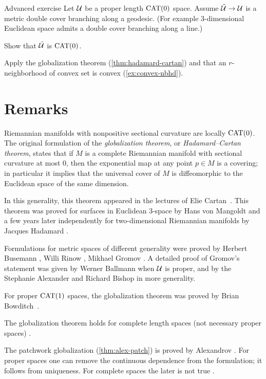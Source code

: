 \begin{thm}{Advanced exercise}\label{ex:branching-cover} 
Let $\mathcal{U}$ be a proper length $\mathrm{CAT}(0)$ space.
Assume $\tilde{\mathcal{U}}\to \mathcal{U}$ is a metric  double cover branching along a geodesic.
(For example 3-dimensional Euclidean space admits a double cover branching along a line.)

Show that $\tilde{\mathcal{U}}$ is $\mathrm{CAT}(0)$.
\end{thm}

 Apply the globalization theorem (\ref{thm:hadamard-cartan}) and that an $r$-neighborhood of convex set is convex (\ref{ex:convex-nbhd}).


\section{Remarks}

Riemannian manifolds with nonpositive sectional curvature are locally $\mathrm{CAT}(0)$.
The original formulation of the 
\emph{globalization theorem}, or 
\emph{Hadamard--Cartan theorem}, states that if $M$ is a complete Riemannian manifold with sectional curvature at most $0$,  
then the exponential map at any point $p\in M$ is a covering;
in particular it implies that the universal cover of $M$ is diffeomorphic to the Euclidean space of the same dimension.

In this generality, this theorem appeared in the lectures of Elie Cartan~\cite{cartan}.
This theorem was proved for surfaces in Euclidean $3$-space 
by Hans von Mangoldt \cite{mangoldt}
and a few years later independently for two-dimensional Riemannian manifolds by Jacques Hadamard \cite{hadamard}.

Formulations for metric spaces of different generality were proved by 
Herbert Busemann \cite{busemann-CBA},
Willi Rinow \cite{rinow},
Mikhael Gromov \cite[p.~119]{gromov-1987}. 
A detailed proof of Gromov's statement was given by Werner Ballmann \cite{ballmann-1995} when $\mathcal{U}$ is proper,
and by the Stephanie Alexander and Richard Bishop \cite{alexander-bishop-1990} in more generality.

For proper $\mathrm{CAT}(1)$ spaces, the globalization theorem was proved by Brian Bowditch~\cite{bowditch}.

The globalization theorem holds for complete length spaces (not necessary proper spaces) \cite{alexander-kapovitch-petrunin-2025}.


The patchwork globalization (\ref{thm:alex-patch}) is proved by Alexandrov \cite[Satz 9]{alexandrov-1957}.
For proper spaces one can remove the continuous dependence from the formulation; it follows from uniqueness.
For complete spaces the later is not true \cite[Chapter I, Exercise 3.14]{bridson-haefliger}.


